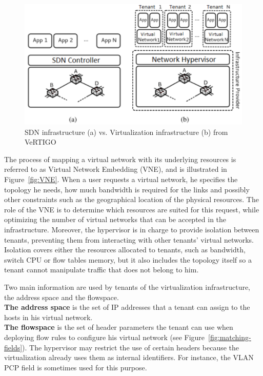 \begin{figure}[ht]
    \centering
    \includegraphics[scale=0.9]{figures/virt-archi.pdf}
    \caption{SDN infrastructure (a) vs. Virtualization infrastructure (b) from VeRTIGO~\cite{VeRTIGO-Corin2012a}}
    \label{fig:virt-archi}
\end{figure}


The process of mapping a virtual network with its underlying resources is referred to as Virtual Network Embedding (VNE), and is illustrated in Figure~\ref{fig:VNE}.
When a user requests a virtual network, he specifies the topology he needs, how much bandwidth is required for the links and possibly other constraints such as the geographical location of the physical resources.
The role of the VNE is to determine which resources are suited for this request, while optimizing the number of virtual networks that can be accepted in the infrastructure.
Moreover, the hypervisor is in charge to provide isolation between tenants, preventing them from interacting with other tenants' virtual networks. Isolation covers either the resources allocated to tenants, such as bandwidth, switch CPU or flow tables memory, but it also includes the topology itself so a tenant cannot manipulate traffic that does not belong to him.

Two main information are used by tenants of the virtualization infrastructure, the address space and the flowspace.\\
\textbf{The address space} is the set of IP addresses that a tenant can assign to the hosts in his virtual network.\\
\textbf{The flowspace} is the set of header parameters the tenant can use when deploying flow rules to configure his virtual network (see Figure~\ref{fig:matching-fields}). The hypervisor may restrict the use of certain headers because the virtualization already uses them as internal identifiers.
For instance, the VLAN PCP field is sometimes used for this purpose.

